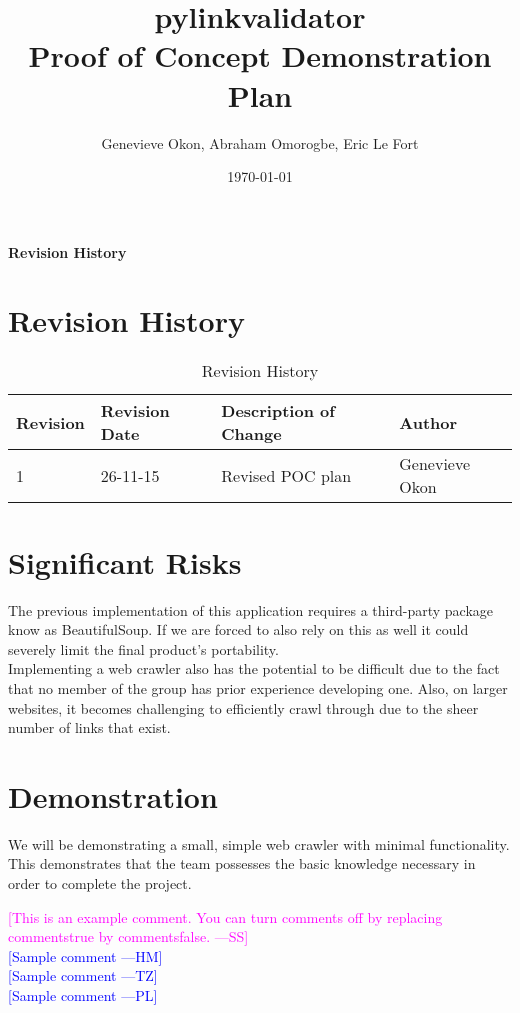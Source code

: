 \documentclass[12pt]{article}
\newcommand{\authornote}[3]{\textcolor{#1}{[#3 ---#2]}}
\newcommand{\authornote}[3]{}
\newcommand{\wss}[1]{\authornote{magenta}{SS}{#1}}
\newcommand{\hm}[1]{\authornote{blue}{HM}{#1}} %
\newcommand{\tz}[1]{\authornote{blue}{TZ}{#1}} %
\newcommand{\pl}[1]{\authornote{blue}{PL}{#1}} %
\begin{document}
\title{pylinkvalidator \\
 Proof of Concept Demonstration Plan }
\author{Genevieve Okon, Abraham Omorogbe, Eric Le Fort}
\date{\today}
\maketitle


\tableofcontents

\listoftables

\textbf{Revision History} \\ \normalsize
\pagebreak

\section{Revision History}
\begin{table}[h!]
	\begin{tabular}{| p{5cm} | p{5cm} | p{5cm} |p{5cm} |}    \hline
Revision  &Revision Date &Description of Change &Author\\ \hline
1& 26-11-15&Revised POC plan&Genevieve Okon\\ \hline

       \end{tabular}
       
       \caption{Revision History}
       \label{table:Revision History}
\end{table}



\section{Significant Risks}
The previous implementation of this application requires a third-party package know as BeautifulSoup. If we are forced to also rely on this as well it could severely limit the final product's portability.\\

Implementing a web crawler also has the potential to be difficult due to the fact that no member of the group has prior experience developing one. Also, on larger websites, it becomes challenging to efficiently crawl through due to the sheer number of links that exist.\\

\section{Demonstration}
We will be demonstrating a small, simple web crawler with minimal functionality. This demonstrates that the team possesses the basic knowledge necessary in order to complete the project.

\noindent \wss{This is an example comment.  You can turn comments off by replacing
  commentstrue by commentsfalse.}\\
\hm{Sample comment}\\
\tz{Sample comment}\\
\pl{Sample comment}
\end{document}
